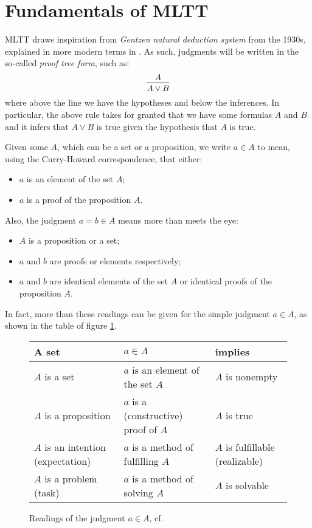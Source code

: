 
\section{Fundamentals of MLTT}

\indent\indent MLTT draws inspiration from \emph{Gentzen natural deduction system}
from the 1930s, explained in more modern terms in \cite{girard}. As such,
judgments will be written in the so-called \emph{proof tree form}, such as:
\[
  \begin{prooftree}
    \hypo{A}
    \infer1{A \lor B}
  \end{prooftree}
\]
where above the line we have the hypotheses and below the inferences.
In particular, the above rule takes for granted that we have some formulas
$ A $ and $ B $ and it infers that $ A \lor B $ is true given the hypothesis
that $ A $ is true.

Given some $ A $, which can be a set or a proposition, we write $ a \in A $
to mean, using the Curry-Howard correspondence, that either:
\begin{itemize}
\item $ a $ is an element of the set $ A $;
\item $ a $ is a proof of the proposition $ A $.
\end{itemize}

Also, the judgment $ a = b \in A $ means more than meets the eye:
\begin{itemize}
\item $ A $ is a proposition or a set;
\item $ a $ and $ b $ are proofs or elements respectively;
\item $ a $ and $ b $ are identical elements of the set $ A $ or
  identical proofs of the proposition $ A $.
\end{itemize}

In fact, more than these readings can be given for the simple judgment
$ a \in A $, as shown in the table of figure \ref{fig:judge}.

\begin{figure}[!htb]
  \centering
  \begin{tabular}{l | l | l}
    A set & $ a \in A $ & implies \\
    \hline
    $ A $ is a set & $ a $ is an element of the set $ A $ & $ A $ is nonempty \\
    $ A $ is a proposition & $ a $ is a (constructive) proof of  $ A $ & $ A $ is true \\
    $ A $ is an intention (expectation) & $ a $ is a method of fulfilling $ A $ & $ A $ is fulfillable (realizable) \\
    $ A $ is a problem (task) & $ a $ is a method of solving $ A $ & $ A $ is solvable
  \end{tabular}
  \caption{Readings of the judgment $ a \in A $, cf.\ \cite[p.\ 4]{mltt}}
  \label{fig:judge}
\end{figure}

